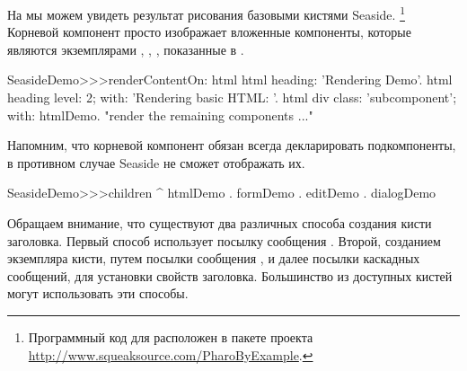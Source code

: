 \documentclass[a4paper,10pt,twoside]{book}
\begin{document}

На  мы можем увидеть результат
рисования базовыми кистями Seaside.
\footnote{Программный код для  расположен в пакете
 проекта \url{http://www.squeaksource.com/PharoByExample}.}
Корневой компонент  просто изображает
вложенные компоненты,
которые являются экземплярами , ,
, показанные в .

\needspace{7ex}
\begin{method}[renderdemo]{}
SeasideDemo>>>renderContentOn: html
	html heading: 'Rendering Demo'.
	html heading
		level: 2;
		with: 'Rendering basic HTML: '.
	html div
		class: 'subcomponent';
		with: htmlDemo.
	"render the remaining components ..."
\end{method}

\noindent
Напомним,
что корневой компонент обязан всегда декларировать подкомпоненты,
в противном случае Seaside не сможет отображать их.


\begin{code}{}
SeasideDemo>>>children
	^ { htmlDemo . formDemo . editDemo . dialogDemo }
\end{code}


Обращаем внимание,
что существуют два различных способа создания кисти заголовка.
Первый способ использует посылку сообщения .
Второй, созданием экземпляра кисти, путем посылки сообщения ,
и далее посылки каскадных сообщений, для установки свойств заголовка.
Большинство из доступных кистей могут использовать эти способы.
\end{document}
